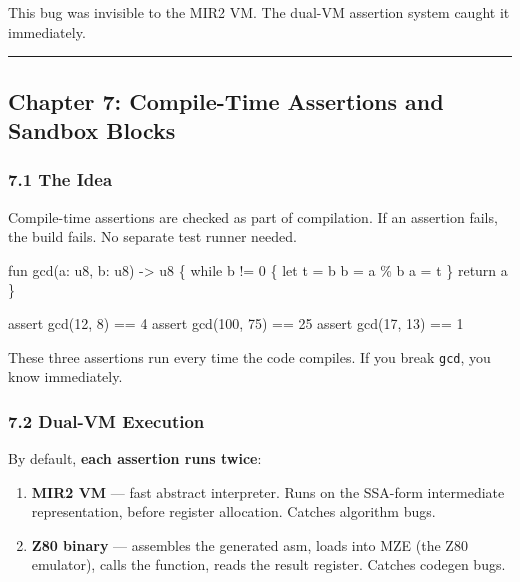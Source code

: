 \documentclass[
  11pt,
]{article}
\newenvironment{Shaded}{}{}
\newcommand{\NormalTok}[1]{#1}
\begin{document}
This bug was invisible to the MIR2 VM. The dual-VM assertion system
caught it immediately.

\begin{center}\rule{0.5\linewidth}{0.5pt}\end{center}

\subsection{Chapter 7: Compile-Time Assertions and Sandbox
Blocks}\label{chapter-7-compile-time-assertions-and-sandbox-blocks}

\subsubsection{7.1 The Idea}\label{the-idea}

Compile-time assertions are checked as part of compilation. If an
assertion fails, the build fails. No separate test runner needed.

\begin{Shaded}
\begin{Highlighting}[]
\NormalTok{fun gcd(a: u8, b: u8) {-}\textgreater{} u8 \{}
\NormalTok{    while b != 0 \{}
\NormalTok{        let t = b}
\NormalTok{        b = a \% b}
\NormalTok{        a = t}
\NormalTok{    \}}
\NormalTok{    return a}
\NormalTok{\}}

\NormalTok{assert gcd(12, 8) == 4}
\NormalTok{assert gcd(100, 75) == 25}
\NormalTok{assert gcd(17, 13) == 1}
\end{Highlighting}
\end{Shaded}

These three assertions run every time the code compiles. If you break
\texttt{gcd}, you know immediately.

\subsubsection{7.2 Dual-VM Execution}\label{dual-vm-execution}

By default, \textbf{each assertion runs twice}:

\begin{enumerate}
\def\labelenumi{\arabic{enumi}.}
\item
  \textbf{MIR2 VM} --- fast abstract interpreter. Runs on the SSA-form
  intermediate representation, before register allocation. Catches
  algorithm bugs.
\item
  \textbf{Z80 binary} --- assembles the generated asm, loads into MZE
  (the Z80 emulator), calls the function, reads the result register.
  Catches codegen bugs.
\end{enumerate}
\end{document}
